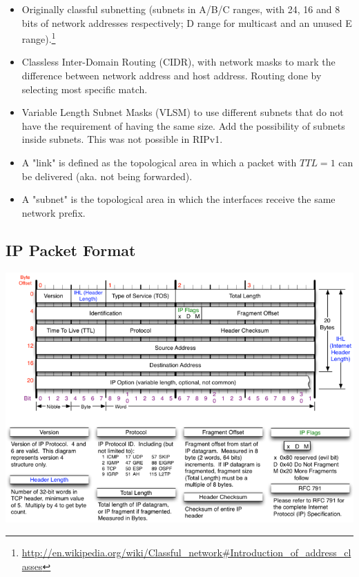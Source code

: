 \documentclass{article}
\begin{document}
\begin{itemize}
	\item Originally classful subnetting (subnets in A/B/C ranges, with 24, 16 and 8 bits of network addresses respectively; D range for multicast and an unused E range).\footnote{\url{http://en.wikipedia.org/wiki/Classful_network#Introduction_of_address_classes}}
	\item Classless Inter-Domain Routing (CIDR), with network masks to mark the difference between network address and host address. Routing done by selecting most specific match.
	\item Variable Length Subnet Masks (VLSM) to use different subnets that do not have the requirement of having the same size. Add the possibility of subnets inside subnets. This was not possible in RIPv1.
	\item A "link" is defined as the topological area in which a packet with $TTL=1$ can be delivered (aka. not being forwarded).
	\item A "subnet" is the topological area in which the interfaces receive the same network prefix.
\end{itemize}


\subsection{IP Packet Format}

\begin{center}
\includegraphics[scale=0.7]{images/IP-Header.png}\\[1cm]
\end{center}

\newpage
\end{document}
